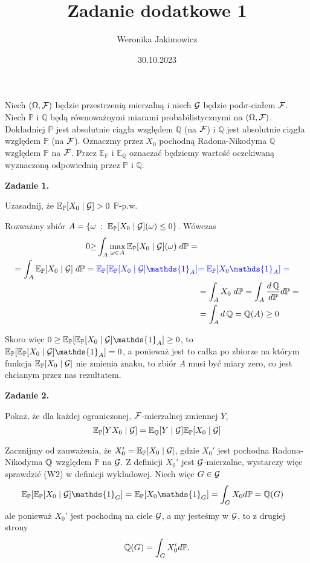 \documentclass{article}
\title{Zadanie dodatkowe 1}
\author{Weronika Jakimowicz}
\date{30.10.2023}
\newcommand{\E}{\mathbb{E}}
\renewcommand{\P}{\mathbb{P}}
\begin{document}
\maketitle
\thispagestyle{empty}

Niech $(\Omega,\mathcal{F})$ będzie przestrzenią mierzalną i niech $\mathcal{G}$ będzie pod$\sigma$-ciałem $\mathcal{F}$. Niech $\P$ i $\mathbb{Q}$ będą równoważnymi miarami probabilistycznymi na $(\Omega,\mathcal{F})$. Dokładniej $\P$ jest absolutnie ciągła względem $\mathbb{Q}$ (na $\mathcal{F}$) i $\mathbb{Q}$ jest absolutnie ciągła względem $\P$ (na $\mathcal{F}$). Oznaczmy przez $X_0$ pochodną Radona-Nikodyma $\mathbb{Q}$ względem $\P$ na $\mathcal{F}$. Przez $\mathbb{E}_\P$ i $\mathbb{E}_{\mathbb{Q}}$ oznaczać będziemy wartość oczekiwaną wyznaczoną odpowiednią przez $\P$ i $\mathbb{Q}$.
\bigskip

{\bfseries{\large\color{orange}Zadanie 1.}

  Uzasadnij, że $\mathbb{E}_\mathbb{P}[X_0\;|\;\mathcal{G}]>0$ $\P$-p.w.
}
\medskip

Rozważmy zbiór $A=\{\omega\;:\;\E_\P[X_0\;|\;\set{G}](\omega)\leq 0\}$. Wówczas
\begin{align*}
  0{\geq}\int_A\max_{\omega\in A}\E_\P[X_0\;|\;\set{G}](\omega)\;d\P=&\\
  =\int_A\E_\P[X_0\;|\;\set{G}]\;d\P={\color{blue}\E_\P[\E_\P[X_0\;|\;\set{G}]\mathds{1}_A]}&{\color{blue}=\E_\P[X_0\mathds{1}_A]=}\\
                                                                              &=\int_AX_0\;d\P=\int_A\frac{d\Q}{d\P}d\P=\\
                                                                              &=\int_Ad\Q=\Q(A)\geq0
\end{align*}

Skoro więc $0\geq \E_\P[\E_\P[X_0\;|\;\set{G}]\mathds{1}_A]\geq 0$, to $\E_\P[\E_\P[X_0\;|\;\set{G}]\mathds{1}_A]=0$, a ponieważ jest to całka po zbiorze na którym funkcja $\E_\P[X_0\;|\;\set{G}]$ nie zmienia znaku, to zbiór $A$ musi być miary zero, co jest chcianym przez nas rezultatem.
\bigskip

{\bfseries{\large\color{orange}Zadanie 2.}

  Pokaż, że dla każdej ograniczonej, $\mathcal{F}$-mierzalnej zmiennej $Y$,
  $$\E_\P[YX_0\;|\;\set{G}]=\E_{\Q} [Y\;|\;\set{G}]\E_{\P}[X_0\;|\;\set{G}]$$
}
\medskip

Zacznijmy od zauważenia, że $X_0'=\E_\P[X_0\;|\;\set{G}]$, gdzie $X_0'$ jest pochodna Radona-Nikodyma $\operatorname{\mathbb{Q}}$ względem $\P$ na $\mathcal{G}$. Z definicji $X_0'$ jest $\mathcal{G}$-mierzalne, wystarczy więc sprawdzić (W2) w definicji wykładowej. Niech więc $G\in\mathcal{G}$
\begin{align*}
  \E_{\P}[\E_{\P}[X_0\;|\;\set{G}]\mathds{1}_G]&=\E_{\P}[X_0\mathds{1}_G]=\int_GX_0d\P=\Q(G)
\end{align*}
ale ponieważ $X_0'$ jest pochodną na ciele $\mathcal{G}$, a my jesteśmy w $\mathcal{G}$, to z drugiej strony
$$\Q(G)=\int_GX_0'd\P.$$
\end{document}
